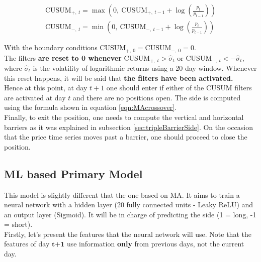\documentclass[a4paper]{article}
\begin{document}
\begin{gather*}
	\text{CUSUM}_{+,\ t} = \max \left( 0,\ \text{CUSUM}_{+,\ t-1} + 
	\log \left( \frac{p_t}{p_{t-1}} \right) \right)\\	
	\text{CUSUM}_{-,\ t} = \min \left( 0,\ \text{CUSUM}_{-,\ t-1} + 
	\log \left( \frac{p_t}{p_{t-1}} \right) \right)
\end{gather*}

With the boundary conditions $\text{CUSUM}_{+,\ 0} = 
\text{CUSUM}_{-,\ 0} = 0$.\\

The filters \textbf{are reset to 0 whenever}
$\text{CUSUM}_{+,\ t} > \hat{\sigma}_t$ or $\text{CUSUM}_{-,\ t} < 
-\hat{\sigma}_t$, where $\hat{\sigma}_t$ is the volatility of 
logarithmic returns using a 20 day window. Whenever this reset 
happens, it will be said that \textbf{the filters have been 
activated.}\\

Hence at this point, at day $t+1$ one should enter if either of the 
CUSUM filters are activated at day $t$ and there are no positions 
open. The side is computed using the formula shown in equation 
\ref{eqn:MAcrossover}.\\

Finally, to exit the position, one needs to compute the vertical and 
horizontal barriers as it was explained in subsection 
\ref{sec:tripleBarrierSide}. On the occasion that the price time 
series moves past a barrier, one should  proceed to close the 
position.

\subsection{ML based Primary Model}
\label{sec:MLPrimaryModel}
This model is slightly different that the one based on MA. It aims to 
train a neural network with a hidden layer (20 fully connected units 
- Leaky ReLU) and an output layer (Sigmoid). It will be in charge of 
predicting the side (1 = long, -1 = short).\\

Firstly, let's present the features that the neural network will use. 
Note that the features of day $\textbf{t+1}$ use information 
\textbf{only} from previous days, not the current day.
\end{document}
